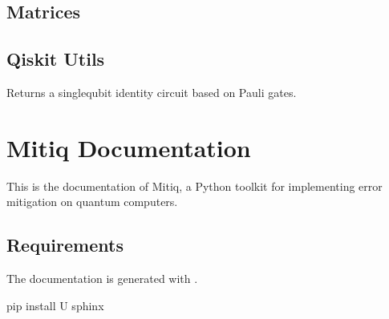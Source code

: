 \documentclass[letterpaper,10pt,english]{sphinxmanual}
\begin{document}
\section{Matrices}
\label{\detokenize{apidoc:module-mitiq.matrices}}\label{\detokenize{apidoc:matrices}}

\section{Qiskit Utils}
\label{\detokenize{apidoc:module-mitiq.qiskit.qiskit_utils}}\label{\detokenize{apidoc:qiskit-utils}}

\begin{fulllineitems}
\label{\detokenize{apidoc:mitiq.qiskit.qiskit_utils.random_identity_circuit}}
Returns a single\sphinxhyphen{}qubit identity circuit based on Pauli gates.

\end{fulllineitems}




\chapter{Mitiq Documentation}
\label{\detokenize{README-docs:mitiq-documentation}}\label{\detokenize{README-docs::doc}}
This is the documentation of Mitiq, a Python toolkit for
implementing error mitigation on quantum computers.


\section{Requirements}
\label{\detokenize{README-docs:requirements}}
The documentation is generated with
.

\begin{sphinxVerbatim}[commandchars=\\\{\}]
pip install \PYGZhy{}U sphinx
\end{sphinxVerbatim}
\end{document}
